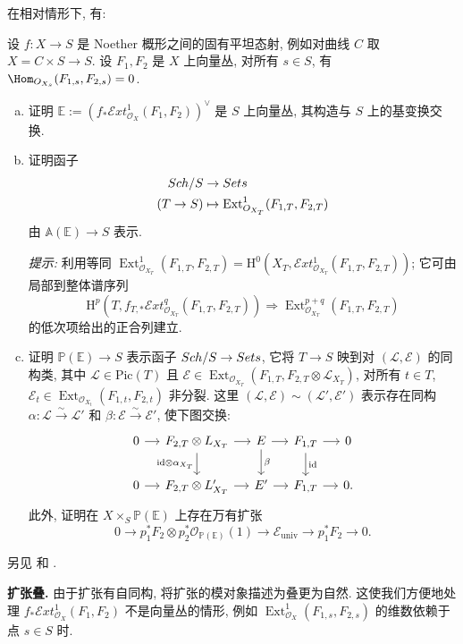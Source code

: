 在相对情形下, 有:
\begin{exercise}[中等]\label{src:9.2.12}
设 $f:X\to S$ 是 Noether 概形之间的固有平坦态射, 例如对曲线 $C$ 取 $X=C\times S\to S$. 设 $F_1,F_2$ 是 $X$ 上向量丛, 对所有 $s\in S$, 有 $\Hom_{\mathcal O_{X_s}}(F_{1,s},F_{2,s})=0$.
\begin{enumerate}[(a)]
\item 证明 $\mathbb E:=(f_*\mathcal E\!xt_{\mathcal O_X}^1(F_1,F_2))^\vee$ 是 $S$ 上向量丛, 其构造与 $S$ 上的基变换交换.
\item 证明函子
\[
\begin{aligned}
Sch/S&\to Sets\\
(T\to S)&\mapsto\operatorname{Ext}_{O_{X_T}}^1(F_{1,T},F_{2,T})
\end{aligned}
\]
由 $\mathbb A(\mathbb E)\to S$ 表示.

\textit{提示:} 利用等同 $\operatorname{Ext}_{\mathcal O_{X_T}}^1(F_{1,T},F_{2,T})=\mathrm H^0(X_T,\mathcal E\!xt_{\mathcal O_{X_T}}^1(F_{1,T},F_{2,T}))$; 它可由局部到整体谱序列
\[
\mathrm H^p(T,f_{T,*}\mathcal E\!xt_{\mathcal O_{X_T}}^q(F_{1,T},F_{2,T}))
\Rightarrow\operatorname{Ext}_{\mathcal O_{X_T}}^{p+q}(F_{1,T},F_{2,T})
\]
的低次项给出的正合列建立.
\item 证明 $\mathbb P(\mathbb E)\to S$ 表示函子 $Sch/S\to Sets$, 它将 $T\to S$ 映到对 $(\mathcal L,\mathcal E)$ 的同构类, 其中 $\mathcal L\in\mathrm{Pic}(T)$ 且 $\mathcal E\in\operatorname{Ext}_{\mathcal O_{X_T}}(F_{1,T},F_{2,T}\otimes\mathcal L_{X_T})$, 对所有 $t\in T$, $\mathcal E_t\in\operatorname{Ext}_{\mathcal O_{X_t}}(F_{1,t},F_{2,t})$ 非分裂. 这里 $(\mathcal L,\mathcal E)\sim(\mathcal L',\mathcal E')$ 表示存在同构 $\alpha:\mathcal L\xrightarrow{\sim}\mathcal L'$ 和 $\beta:\mathcal E\xrightarrow{\sim}\mathcal E'$, 使下图交换:
\[
\begin{tikzcd}[ampersand replacement=\&,column sep=small]
0\arrow[r]\&F_{2,T}\otimes\mathcal L_{X_T}\arrow[r]\arrow[d,"{\mathrm{id}\otimes\alpha_{X_T}}"']\&\mathcal E\arrow[r]\arrow[d,"\beta"]\&F_{1,T}\arrow[r]\arrow[d,"\mathrm{id}"]\&0\\
0\arrow[r]\&F_{2,T}\otimes\mathcal L'_{X_T}\arrow[r]\&\mathcal E'\arrow[r]\&F_{1,T}\arrow[r]\&0.
\end{tikzcd}
\]
此外, 证明在 $X\times_S\mathbb P(\mathbb E)$ 上存在万有扩张
\[
0\to p_1^*F_2\otimes p_2^*\mathcal O_{\mathbb P(\mathbb E)}(1)
\to\mathcal E_{\mathrm{univ}}\to p_1^*F_2\to0.
\]
\end{enumerate}
另见 \cite[附录 II, 命题 2]{Ses82} 和 \cite{Lan83a}.
\end{exercise}
\textbf{扩张叠.} 由于扩张有自同构, 将扩张的模对象描述为叠更为自然. 这使我们方便地处理 $f_*\mathcal E\!xt_{\mathcal O_X}^1(F_1,F_2)$ 不是向量丛的情形, 例如 $\operatorname{Ext}_{\mathcal O_X}^1(F_{1,s},F_{2,s})$ 的维数依赖于点 $s\in S$ 时.

